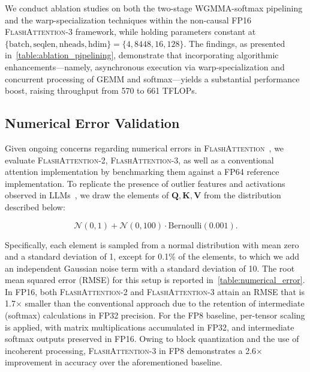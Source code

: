 \begin{enumerate}
We conduct ablation studies on both the two-stage WGMMA-softmax pipelining and the warp-specialization techniques within the non-causal FP16 \textsc{FlashAttention-3} framework, while holding parameters constant at $\{\text{batch}, \text{seqlen}, \text{nheads}, \text{hdim}\} = \{ 4, 8448, 16, 128\}$. The findings, as presented in~\cref{table:ablation_pipelining}, demonstrate that incorporating algorithmic enhancements—namely, asynchronous execution via warp-specialization and concurrent processing of GEMM and softmax—yields a substantial performance boost, raising throughput from 570 to 661 TFLOPs.

\subsection{Numerical Error Validation}
\label{sec:numerical_error}

Given ongoing concerns regarding numerical errors in \textsc{FlashAttention}~\citep{golden2024flash}, we evaluate \textsc{FlashAttention-2}, \textsc{FlashAttention-3}, as well as a conventional attention implementation by benchmarking them against a FP64 reference implementation. To replicate the presence of outlier features and activations observed in LLMs~\citep{dettmers2208llm, sun2024massive}, we draw the elements of $\mathbf{Q}, \mathbf{K}, \mathbf{V}$ from the distribution described below:

\begin{equation*}
  \mathcal{N}(0, 1) + \mathcal{N}(0, 100) \cdot \mathrm{Bernoulli}(0.001).
\end{equation*}

Specifically, each element is sampled from a normal distribution with mean zero and a standard deviation of 1, except for 0.1\% of the elements, to which we add an independent Gaussian noise term with a standard deviation of 10. The root mean squared error (RMSE) for this setup is reported in~\cref{table:numerical_error}. In FP16, both \textsc{FlashAttention-2} and \textsc{FlashAttention-3} attain an RMSE that is 1.7$\times$ smaller than the conventional approach due to the retention of intermediate (softmax) calculations in FP32 precision. For the FP8 baseline, per-tensor scaling is applied, with matrix multiplications accumulated in FP32, and intermediate softmax outputs preserved in FP16. Owing to block quantization and the use of incoherent processing, \textsc{FlashAttention-3} in FP8 demonstrates a 2.6$\times$ improvement in accuracy over the aforementioned baseline.


\end{enumerate}
